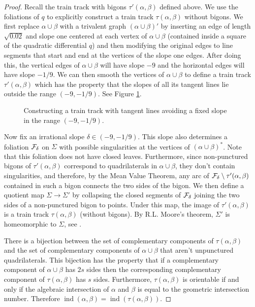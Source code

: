 \documentclass[11pt]{article}
\theoremstyle{remark}
\def\ind{\operatorname{ind}}
\newcommand{\cF}{{\cal F}}
\begin{document}
\begin{proof}
Recall the train track with bigons $\tau'(\alpha, \beta)$ defined above. We use
the foliations of $q$ to explicitly construct a train track $\tau(\alpha, \beta)$
without bigons. We first replace
$\alpha\cup\beta$ with a trivalent graph $(\alpha\cup\beta)'$ by inserting an
edge of length $\sqrt{0.02}$ and slope one centered at each vertex of
$\alpha\cup\beta$ (contained inside a square of the quadratic differential $q$)
and then modifying the original edges to line segments that start and end at the vertices of the slope one edges. After doing this, the vertical edges of $\alpha\cup \beta$ will have slope $-9$ and the horizontal edges will have slope $-1/9$.
We can then smooth the vertices of $\alpha\cup \beta$ to define a train track
$\tau'(\alpha, \beta)$ which has the property that the slopes of all its tangent lines
lie outside the range $\left(-9, -1/9\right)$.
See Figure \ref{fig:smoothing}.

\begin{figure}[h]

  \centering

  \def\svgwidth{0.9\textwidth}
  

  \caption{Constructing a train track with tangent lines avoiding a fixed slope in the
  range $(-9,-1/9)$.}
  \label{fig:smoothing}
\end{figure}


Now fix an irrational slope $\delta \in (-9, -1/9)$. This slope also determines a foliation $\cF_\delta$ on $\Sigma$ with possible singularities at the vertices of $(\alpha\cup\beta)^*$. Note that this foliation does not have closed leaves.
Furthermore, since non-punctured bigons of $\tau'(\alpha, \beta)$ correspond to quadrilaterals in $\alpha\cup\beta$, they don't contain singularities, and therefore, by the Mean Value Theorem,
any arc of $\cF_\delta\setminus \tau'(\alpha,\beta)$ contained in such a bigon connects
the two sides of the bigon.
We then define a quotient map $\Sigma \to \Sigma'$  by collapsing the closed segments
of $\cF_\delta$ joining the two sides of a non-punctured bigon to points.
Under this map, the image of $\tau'(\alpha,\beta)$ is a train
track $\tau(\alpha, \beta)$ (without bigons). By R.L. Moore's theorem,
$\Sigma'$ is homeomorphic to $\Sigma$, see \cite[Section 25]{daverman}.

There is a bijection between the set of complementary components of $\tau(\alpha,\beta)$ and the set of complementary components of
$\alpha\cup \beta$ that aren't unpunctured quadrilaterals.
This bijection has the property that if a complementary
component of $\alpha\cup\beta$ has $2s$ sides then the corresponding complementary
component of $\tau(\alpha,\beta)$ has $s$ sides. Furthermore, $\tau(\alpha,\beta)$
is orientable if and only if the algebraic intersection of $\alpha$ and $\beta$ is equal to the geometric intersection number. Therefore $\ind(\alpha,\beta) = \ind(\tau(\alpha, \beta))$.
\end{proof}
\end{document}
